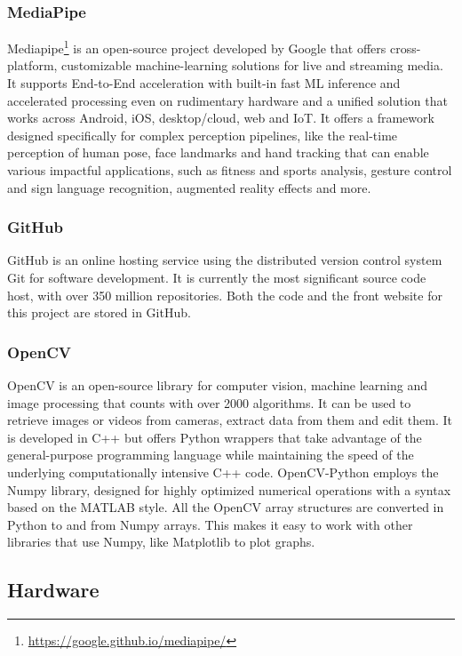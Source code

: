 \subsubsection{MediaPipe}
\label{subsec:mediapipe}
Mediapipe\footnote{\url{https://google.github.io/mediapipe/}} is an open-source project developed by Google that offers cross-platform, customizable machine-learning solutions for live and streaming media.
It supports End-to-End acceleration with built-in fast ML inference and accelerated processing even on rudimentary hardware and a unified solution that works across Android, iOS, desktop/cloud, web and IoT.
It offers a framework designed specifically for complex perception pipelines, like the real-time perception of human pose, face landmarks and hand tracking that can enable various impactful applications, such as fitness and sports analysis, gesture control and sign language recognition, augmented reality effects and more.


\subsubsection{GitHub}
\label{subsec:github}
GitHub is an online hosting service using the distributed version control system Git for software development. It is currently the most significant source code host, with over 350 million repositories.
Both the code and the front website for this project are stored in GitHub.


\subsubsection{OpenCV}
\label{subsec:opencv}
OpenCV is an open-source library for computer vision, machine learning and image processing that counts with over 2000 algorithms. 
It can be used to retrieve images or videos from cameras, extract data from them and edit them.
It is developed in C++ but offers Python wrappers that take advantage of the general-purpose programming language while maintaining the speed of the underlying computationally intensive C++ code.
OpenCV-Python employs the Numpy library, designed for highly optimized numerical operations with a syntax based on the MATLAB style.
All the OpenCV array structures are converted in Python to and from Numpy arrays. 
This makes it easy to work with other libraries that use Numpy, like Matplotlib to plot graphs.


\subsection{Hardware}
